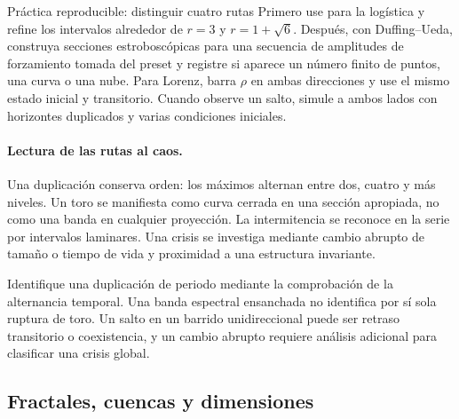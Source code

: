 \begin{activitybox}{Práctica reproducible: distinguir cuatro rutas}
Primero use  para la logística y refine los intervalos alrededor de
\(r=3\) y \(r=1+\sqrt6\). Después, con Duffing--Ueda, construya secciones
estroboscópicas para una secuencia de amplitudes de forzamiento tomada del preset y
registre si aparece un número finito de puntos, una curva o una nube. Para Lorenz,
barra \(\rho\) en ambas direcciones y use el mismo estado inicial y transitorio.
Cuando observe un salto, simule a ambos lados con horizontes duplicados y varias
condiciones iniciales.
\end{activitybox}

\paragraph{Lectura de las rutas al caos.}
Una duplicación conserva orden: los máximos alternan entre dos, cuatro y más niveles.
Un toro se manifiesta como curva cerrada en una sección apropiada, no como una banda
en cualquier proyección. La intermitencia se reconoce en la serie por intervalos
laminares. Una crisis se investiga mediante cambio abrupto de tamaño o tiempo de vida
y proximidad a una estructura invariante.

\begin{warningbox}
Identifique una duplicación de periodo mediante la comprobación de la alternancia
temporal. Una banda espectral ensanchada no identifica por sí sola ruptura de toro.
Un salto en un barrido unidireccional puede ser retraso transitorio o coexistencia, y
un cambio abrupto requiere análisis adicional para clasificar una crisis global.
\end{warningbox}


\subsection{Fractales, cuencas y dimensiones}

